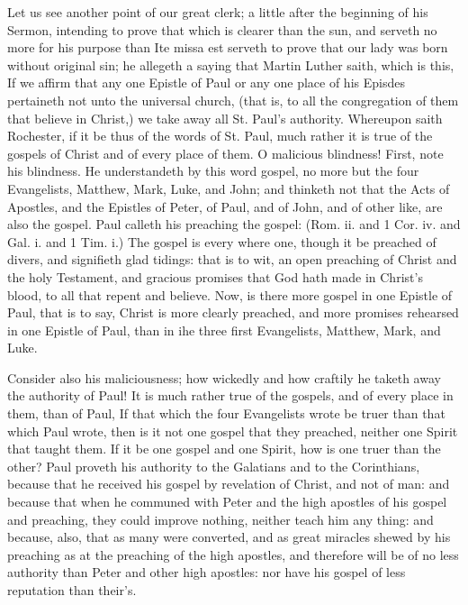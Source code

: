 Let us see another point of our great clerk; a little after
the beginning of his Sermon, intending to prove that which
is clearer than the sun, and serveth no more for his purpose
than Ite missa est serveth to prove that our lady was 
born without original sin; he allegeth a saying that Martin 
Luther saith, which is this, If we affirm that any one 
Epistle of Paul or any one place of his Episdes pertaineth 
not unto the universal church, (that is, to all the congregation
of them that believe in Christ,) we take away all St. 
Paul's authority. Whereupon saith Rochester, if it be thus 
of the words of St. Paul, much rather it is true of the gospels
of Christ and of every place of them. O malicious 
blindness! First, note his blindness. He understandeth 
by this word gospel, no more but the four Evangelists, 
Matthew, Mark, Luke, and John; and thinketh not that 
the Acts of Apostles, and the Epistles of Peter, of Paul,
and of John, and of other like, are also the gospel. Paul
calleth his preaching the gospel: (Rom. ii. and 1 Cor. iv.
and Gal. i. and 1 Tim. i.) The gospel is every where 
one, though it be preached of divers, and signifieth glad
tidings: that is to wit, an open preaching of Christ and
the holy Testament, and gracious promises that God hath 
made in Christ's blood, to all that repent and believe. 
Now, is there more gospel in one Epistle of Paul, that is to 
say, Christ is more clearly preached, and more promises 
rehearsed in one Epistle of Paul, than in ihe three first 
Evangelists, Matthew, Mark, and Luke. 

Consider also his maliciousness; how wickedly and how 
craftily he taketh away the authority of Paul! It is much 
rather true of the gospels, and of every place in them, than 
of Paul, If that which the four Evangelists wrote be 
truer than that which Paul wrote, then is it not one gospel 
that they preached, neither one Spirit that taught them.
If it be one gospel and one Spirit, how is one truer than 
the other? Paul proveth his authority to the Galatians 
and to the Corinthians, because that he received his gospel 
by revelation of Christ, and not of man: and because that 
when he communed with Peter and the high apostles of 
his gospel and preaching, they could improve nothing, 
neither teach him any thing: and because, also, that as 
many were converted, and as great miracles shewed by his 
preaching as at the preaching of the high apostles, and 
therefore will be of no less authority than Peter and other 
high apostles: nor have his gospel of less reputation 
than their's. 

